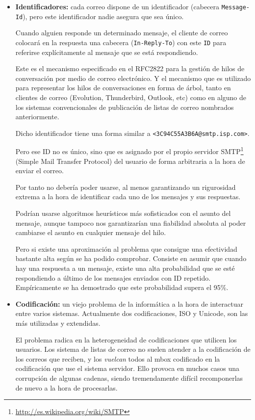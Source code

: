 \begin{itemize}

  \item \textbf{Identificadores:} cada correo dispone de un identificador 
	(cabecera \texttt{Message-Id}), pero este identificador nadie 
	asegura que sea único.

	Cuando alguien responde un determinado mensaje, el cliente de correo 
	colocará en la respuesta una cabecera (\texttt{In-Reply-To}) con este 
	\texttt{ID} para referirse explícitamente al mensaje que se está 
	respondiendo.

	Este es el mecanismo especificado en el RFC2822\cite{Resnick2001} para 
	la gestión de hilos de conversación por medio de correo electrónico. 
	Y el mecanismo que es utilizado para representar los hilos de 
	conversaciones en forma de árbol, tanto en clientes de correo (Evolution, 
	Thunderbird, Outlook, etc) como en alguno de los sistemas convencionales 
	de publicación de listas de correo nombrados anteriormente.

	Dicho identificador tiene una forma similar a 
	\texttt{<3C94C55A3B6A@smtp.isp.com>}.

	Pero ese ID no es único, sino que es asignado por el propio servidor
	SMTP\footnote{\url{http://es.wikipedia.org/wiki/SMTP}} (Simple Mail 
	Transfer Protocol) del usuario de forma arbitraria a la hora de enviar 
	el correo.

	Por tanto no debería poder usarse, al menos garantizando un rigurosidad 
	extrema a la hora de identificar cada uno de los mensajes y sus respuestas.

	Podrían usarse algoritmos heurísticos más sofisticados con el asunto del 
	mensaje, aunque tampoco nos garantizarían una fiabilidad absoluta al 
	poder cambiarse el asunto en cualquier mensaje del hilo.

	Pero si existe una aproximación al problema que consigue una efectividad 
	bastante alta según se ha podido comprobar. Consiste en asumir que cuando 
	hay una respuesta a un mensaje, existe una alta probabilidad que se esté 
	respondiendo a último de los mensajes enviados con ID repetido. Empíricamente 
	se ha demostrado que este probabilidad supera el 95\%.

  \item \textbf{Codificación:} un viejo problema de la informática a la hora de 
	interactuar entre varios sistemas. Actualmente dos codificaciones, ISO 
	y Unicode, son las más utilizadas y extendidas.

	El problema radica en la heterogeneidad de codificaciones que utilicen 
	los usuarios. Los sistema de listas de correo no suelen atender a la 
	codificación de los correos que reciben, y los \emph{vuelcan} todos al 
	mbox codificado en la codificación que use el sistema servidor. Ello 
	provoca en muchos casos una corrupción de algunas cadenas, siendo 
	tremendamente difícil recomponerlas de nuevo a la hora de procesarlas.

\end{itemize}

